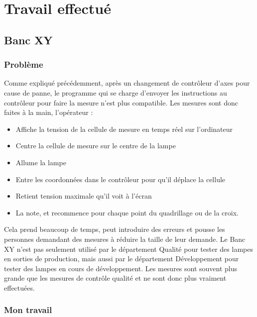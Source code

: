 \documentclass[12pt]{article}
\begin{document}
\section{Travail effectué}

\subsection{Banc XY}

\subsubsection{Problème}

Comme expliqué précédemment, après un changement de contrôleur d'axes pour cause de panne, le programme qui se charge d'envoyer les instructions au contrôleur pour faire la mesure n'est plus compatible.
Les mesures sont donc faites à la main, l'opérateur :
\begin{itemize}
		\label{etapesMesureBancXY}

	\item Affiche la tension de la cellule de mesure en temps réel sur l'ordinateur
	\item Centre la cellule de mesure sur le centre de la lampe
	\item Allume la lampe
	\item Entre les coordonnées dans le contrôleur pour qu'il déplace la cellule
	\item Retient tension maximale qu'il voit à l'écran
	\item La note, et recommence pour chaque point du quadrillage ou de la croix.
\end{itemize}
Cela prend beaucoup de temps, peut introduire des erreurs et pousse les personnes demandant des mesures à réduire la taille de leur demande.
Le Banc XY n'est pas seulement utilisé par le département Qualité pour tester des lampes en sorties de production, mais aussi par le département Développement pour tester des lampes en cours de développement.
Les mesures sont souvent plus grande que les mesures de contrôle qualité et ne sont donc plus vraiment effectuées.

\subsubsection{Mon travail}
\end{document}
